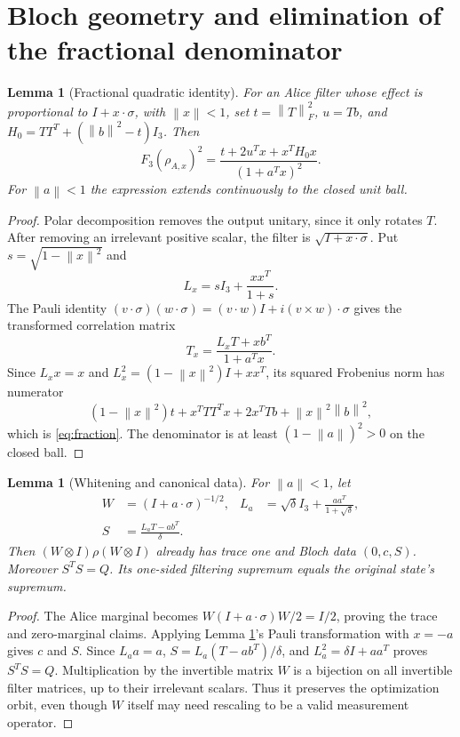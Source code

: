 \documentclass[11pt]{article}
\newtheorem{lemma}[theorem]{Lemma}
\theoremstyle{remark}\newtheorem{remark}[theorem]{Remark}
\newcommand{\norm}[1]{\left\lVert#1\right\rVert}
\begin{document}
\section{Bloch geometry and elimination of the fractional denominator}\label{sec:fraction}

\begin{lemma}[Fractional quadratic identity]\label{lem:fraction}
For an Alice filter whose effect is proportional to $I+x\cdot\sigma$, with
$\norm x<1$, set $t=\norm T_F^2$, $u=Tb$, and
$H_0=TT^T+(\norm b^2-t)I_3$. Then
\begin{equation}\label{eq:fraction}
 F_3(\rho_{A,x})^2=
 \frac{t+2u^Tx+x^TH_0x}{(1+a^Tx)^2}.
\end{equation}
For $\norm a<1$ the expression extends continuously to the closed unit ball.
\end{lemma}
\begin{proof}
Polar decomposition removes the output unitary, since it only rotates $T$.
After removing an irrelevant positive scalar, the filter is
$\sqrt{I+x\cdot\sigma}$. Put $s=\sqrt{1-\norm x^2}$ and
\[
 L_x=sI_3+\frac{xx^T}{1+s}.
\]
The Pauli identity
$(v\cdot\sigma)(w\cdot\sigma)=(v\cdot w)I+i(v\times w)\cdot\sigma$
gives the transformed correlation matrix
\[
 T_x=\frac{L_xT+xb^T}{1+a^Tx}.
\]
Since $L_xx=x$ and $L_x^2=(1-\norm x^2)I+xx^T$, its squared Frobenius norm
has numerator
\[
 (1-\norm x^2)t+x^TTT^Tx+2x^TTb+\norm x^2\norm b^2,
\]
which is \eqref{eq:fraction}. The denominator is at least
$(1-\norm a)^2>0$ on the closed ball.
\end{proof}

\begin{lemma}[Whitening and canonical data]\label{lem:white}
For $\norm a<1$, let
\begin{align}\label{eq:white}
 W&=(I+a\cdot\sigma)^{-1/2}, &
 L_a&=\sqrt\delta I_3+\frac{aa^T}{1+\sqrt\delta},\\
 S&=\frac{L_aT-ab^T}{\delta}.\nonumber
\end{align}
Then $(W\otimes I)\rho(W\otimes I)$ already has trace one and Bloch data
$(0,c,S)$. Moreover $S^TS=Q$. Its one-sided filtering supremum equals the
original state's supremum.
\end{lemma}
\begin{proof}
The Alice marginal becomes $W(I+a\cdot\sigma)W/2=I/2$, proving the trace
and zero-marginal claims. Applying Lemma \ref{lem:fraction}'s Pauli
transformation with $x=-a$ gives $c$ and $S$. Since $L_aa=a$,
$S=L_a(T-ab^T)/\delta$, and $L_a^2=\delta I+aa^T$ proves $S^TS=Q$.
Multiplication by the invertible matrix $W$ is a bijection on all invertible
filter matrices, up to their irrelevant scalars. Thus it preserves the
optimization orbit, even though $W$ itself may need rescaling to be a valid
measurement operator.
\end{proof}
\end{document}
